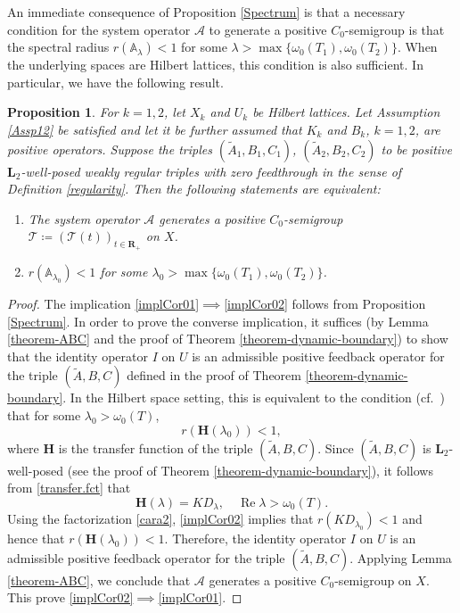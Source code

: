 \documentclass[a4paper,11pt,reqno]{amsart}
\def\A{{\mathbb{A}}}
\def\calT{{\mathcal{T}}}
\def\calA{{\mathcal{A}}}
\def\R{\mathbf{R}}
\theoremstyle{plain}
\newtheorem{proposition}{Proposition}[section]
\numberwithin{equation}{section}
\begin{document}
An immediate consequence of Proposition \ref{Spectrum} is that a necessary condition for the system operator $\mathcal{A}$ to generate a positive $C_0$-semigroup is that the spectral radius $r(\mathbb{A}_\lambda) < 1$ for some $\lambda > \max\{\omega_0(T_1), \omega_0(T_2)\}$. When the underlying spaces are Hilbert lattices, this condition is also sufficient. In particular, we have the following result.
\begin{proposition}\label{sharp-wellposedness-cond}
For $k=1,2$, let $X_k$ and $U_k$ be Hilbert lattices. Let Assumption \ref{Assp12} be satisfied and let it be further assumed that $K_k$ and $B_k$, $k=1,2$, are positive operators. Suppose the triples $(\tilde{A}_1,B_1, C_1)$, $(\tilde{A}_2,B_2,C_2)$ to be positive $\bm{L}_2$-well-posed weakly regular triples with zero feedthrough in the sense of Definition \ref{regularity}. Then the following statements are equivalent:
\begin{enumerate}[\normalfont(1)]
\item\label{implCor01} The system operator $\calA$ generates a positive $C_0$-semigroup $\calT\coloneqq (\calT(t))_{t\in\R_+}$ on $X$.
\item\label{implCor02} $r(\A_{\lambda_0})<1$ for some $\lambda_0>\max\big\{\omega_0(T_1), \omega_0(T_2)\big\}$.
\end{enumerate}
\end{proposition}
\begin{proof}
The implication \ref{implCor01}$\implies$\ref{implCor02} follows from Proposition \ref{Spectrum}. In order to prove the converse implication, it suffices (by Lemma \ref{theorem-ABC} and the proof of Theorem \ref{theorem-dynamic-boundary}) to show that the identity operator $I$ on $U$ is an admissible positive feedback operator for the triple $(\tilde{A},B,C)$ defined in the proof of Theorem \ref{theorem-dynamic-boundary}. In the Hilbert space setting, this is equivalent to the condition (cf.\ \cite[Remark 3.4]{GANTOUH2026106307}) that for some $\lambda_0>\omega_0(T)$,
\begin{equation*}
r(\mathbf{H}(\lambda_0))<1,
\end{equation*}
where $\mathbf{H}$ is the transfer function of the triple $(\tilde{A},B,C)$. Since $(\tilde{A},B,C)$ is $\bm{L}_2$-well-posed (see the proof of Theorem \ref{theorem-dynamic-boundary}), it follows from \eqref{transfer.fct} that
\begin{equation*}
\mathbf{H}(\lambda) = K D_\lambda,\quad \operatorname{Re}\lambda>\omega_0(T).
\end{equation*}
Using the factorization \eqref{cara2}, \ref{implCor02} implies that $r(K D_{\lambda_0})<1$ and hence that $r(\mathbf{H}(\lambda_0))<1$. Therefore, the identity operator $I$ on $U$ is an admissible positive feedback operator for the triple $(\tilde{A},B,C)$. Applying Lemma \ref{theorem-ABC}, we conclude that $\calA$ generates a positive $C_0$-semigroup on $X$. This prove \ref{implCor02}$\implies$\ref{implCor01}. 
\end{proof}
\end{document}

